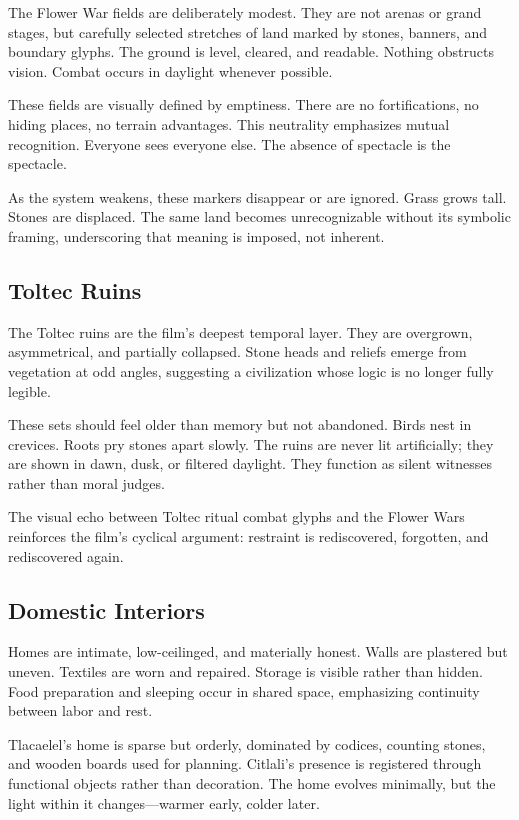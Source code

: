 \documentclass[12pt]{article}
\begin{document}
The Flower War fields are deliberately modest. They are not arenas or grand stages, but carefully selected stretches of land marked by stones, banners, and boundary glyphs. The ground is level, cleared, and readable. Nothing obstructs vision. Combat occurs in daylight whenever possible.

These fields are visually defined by emptiness. There are no fortifications, no hiding places, no terrain advantages. This neutrality emphasizes mutual recognition. Everyone sees everyone else. The absence of spectacle is the spectacle.

As the system weakens, these markers disappear or are ignored. Grass grows tall. Stones are displaced. The same land becomes unrecognizable without its symbolic framing, underscoring that meaning is imposed, not inherent.

\subsection*{Toltec Ruins}

The Toltec ruins are the film's deepest temporal layer. They are overgrown, asymmetrical, and partially collapsed. Stone heads and reliefs emerge from vegetation at odd angles, suggesting a civilization whose logic is no longer fully legible.

These sets should feel older than memory but not abandoned. Birds nest in crevices. Roots pry stones apart slowly. The ruins are never lit artificially; they are shown in dawn, dusk, or filtered daylight. They function as silent witnesses rather than moral judges.

The visual echo between Toltec ritual combat glyphs and the Flower Wars reinforces the film's cyclical argument: restraint is rediscovered, forgotten, and rediscovered again.

\subsection*{Domestic Interiors}

Homes are intimate, low-ceilinged, and materially honest. Walls are plastered but uneven. Textiles are worn and repaired. Storage is visible rather than hidden. Food preparation and sleeping occur in shared space, emphasizing continuity between labor and rest.

Tlacaelel's home is sparse but orderly, dominated by codices, counting stones, and wooden boards used for planning. Citlali's presence is registered through functional objects rather than decoration. The home evolves minimally, but the light within it changes—warmer early, colder later.
\end{document}

